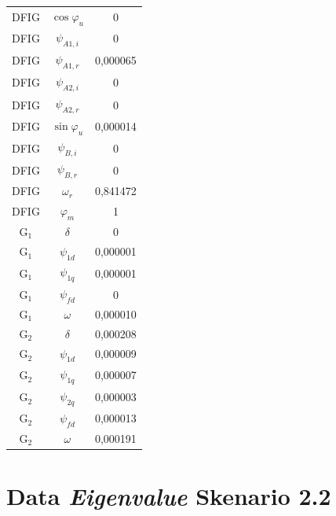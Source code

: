 \begin{longtable}{c c c}
	DFIG & $\cos\varphi_u$ & 0        \\
	DFIG & $\psi_{A1,i}$ & 0        \\
	DFIG & $\psi_{A1,r}$ & 0,000065 \\
	DFIG & $\psi_{A2,i}$ & 0        \\
	DFIG & $\psi_{A2,r}$ & 0        \\
	DFIG & $\sin\varphi_u$ & 0,000014 \\
	DFIG & $\psi_{B,i}$ & 0        \\
	DFIG & $\psi_{B,r}$ & 0        \\
	DFIG & $\omega_r$ & 0,841472 \\
	DFIG & $\varphi_m$ & 1        \\
	G$_1$ & $\delta$ & 0        \\
	G$_1$ & $\psi_{1d}$ & 0,000001 \\
	G$_1$ & $\psi_{1q}$ & 0,000001 \\
	G$_1$ & $\psi_{fd}$ & 0        \\
	G$_1$ & $\omega$ & 0,000010 \\
	G$_2$ & $\delta$ & 0,000208 \\
	G$_2$ & $\psi_{1d}$ & 0,000009 \\
	G$_2$ & $\psi_{1q}$ & 0,000007 \\
	G$_2$ & $\psi_{2q}$ & 0,000003 \\
	G$_2$ & $\psi_{fd}$ & 0,000013 \\
	G$_2$ & $\omega$ & 0,000191 \\
\end{longtable}
\par
\endgroup

\section{Data \textit{Eigenvalue} Skenario 2.2}

